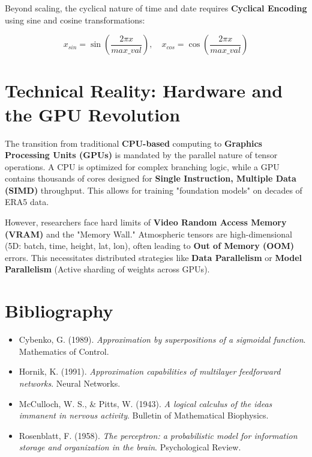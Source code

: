 Beyond scaling, the cyclical nature of time and date requires \textbf{Cyclical Encoding} using sine and cosine transformations:

\begin{equation}
x_{sin} = \sin\left(\frac{2\pi x}{max\_val}\right), \quad x_{cos} = \cos\left(\frac{2\pi x}{max\_val}\right)
\end{equation}

\section{Technical Reality: Hardware and the GPU Revolution}

The transition from traditional \textbf{CPU-based} computing to \textbf{Graphics Processing Units (GPUs)} is mandated by the parallel nature of tensor operations. A CPU is optimized for complex branching logic, while a GPU contains thousands of cores designed for \textbf{Single Instruction, Multiple Data (SIMD)} throughput. This allows for training "foundation models" on decades of ERA5 data.

However, researchers face hard limits of \textbf{Video Random Access Memory (VRAM)} and the "Memory Wall." Atmospheric tensors are high-dimensional (5D: batch, time, height, lat, lon), often leading to \textbf{Out of Memory (OOM)} errors. This necessitates distributed strategies like \textbf{Data Parallelism} or \textbf{Model Parallelism} (Active sharding of weights across GPUs).

\section*{Bibliography}
\begin{itemize}
    \item Cybenko, G. (1989). \textit{Approximation by superpositions of a sigmoidal function}. Mathematics of Control.
    \item Hornik, K. (1991). \textit{Approximation capabilities of multilayer feedforward networks}. Neural Networks.
    \item McCulloch, W. S., \& Pitts, W. (1943). \textit{A logical calculus of the ideas immanent in nervous activity}. Bulletin of Mathematical Biophysics.
    \item Rosenblatt, F. (1958). \textit{The perceptron: a probabilistic model for information storage and organization in the brain}. Psychological Review.
\end{itemize}
